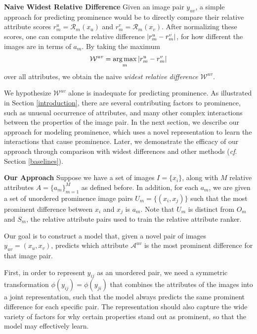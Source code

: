 \documentclass[10pt,twocolumn,letterpaper]{article}
\DeclareMathOperator*{\argmax}{arg\,max}
\begin{document}
\vspace{0.22cm}

\noindent \textbf{Naive Widest Relative Difference} \hspace{1em} Given an image pair $y_{uv}$, a simple approach for predicting prominence would be to directly compare their relative attribute scores $r_m^u = \mathcal{R}_m(x_u)$ and $r_m^v = \mathcal{R}_m(x_v)$. After normalizing these scores, one can compute the relative difference $\abs{r_m^u - r_m^v}$, for how different the images are in terms of $a_m$. By taking the maximum
\begin{align}
    \mathcal{W}^{uv} = \argmax_m \abs{r_m^u - r_m^v}
\end{align}
over all attributes, we obtain the naive \textit{widest relative difference} $\mathcal{W}^{uv}$.

We hypothesize $\mathcal{W}^{uv}$ alone is inadequate for predicting prominence. As illustrated in Section \ref{introduction}, there are several contributing factors to prominence, such as unusual occurrence of attributes, and many other complex interactions between the properties of the image pair. In the next section, we describe our approach for modeling prominence, which uses a novel representation to learn the interactions that cause prominence. Later, we demonstrate the efficacy of our approach through comparison with widest differences and other methods (\textit{cf}. Section \ref{baselines}).

\vspace{0.22cm}

\noindent \textbf{Our Approach} \hspace{1em} Suppose we have a set of images $I = \{x_i\}$, along with $M$ relative attributes $A = \{a_m\}_{m=1}^M$ as defined before. In addition, for each $a_m$, we are given a set of unordered prominence image pairs $U_m = \{(x_i, x_j)\}$ such that the most prominent difference between $x_i$ and $x_j$ is $a_m$. Note that $U_m$ is distinct from $O_m$ and $S_m$, the relative attribute pairs used to train the relative attribute ranker.

Our goal is to construct a model that, given a novel pair of images $y_{uv} = (x_u, x_v)$, predicts which attribute $\mathcal{A}^{uv}$ is the most prominent difference for that image pair.

First, in order to represent $y_{ij}$ as an unordered pair, we need a symmetric transformation $\phi(y_{ij}) = \phi(y_{ji})$ that combines the attributes of the images into a joint representation, such that the model always predicts the same prominent difference for each specific pair. The representation should also capture the wide variety of factors for why certain properties stand out as prominent, so that the model may effectively learn.
\end{document}
